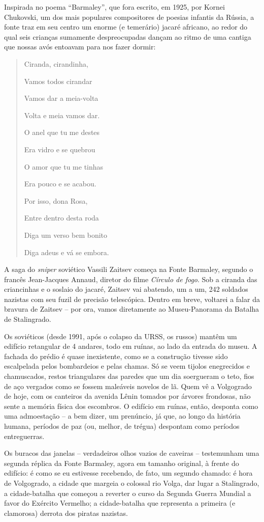 Inspirada no poema ``Barmaley'', que fora escrito, em 1925, por Kornei
Chukovski, um dos mais populares compositores de poesias infantis da
Rússia, a fonte traz em seu centro um enorme (e temerário) jacaré
africano, ao redor do qual seis crianças sumamente despreocupadas dançam
ao ritmo de uma cantiga que nossas avós entoavam para nos fazer dormir:

\begin{quote}
Ciranda, cirandinha,

Vamos todos cirandar

Vamos dar a meia-volta

Volta e meia vamos dar.

O anel que tu me destes

Era vidro e se quebrou

O amor que tu me tinhas

Era pouco e se acabou.

Por isso, dona Rosa,

Entre dentro desta roda

Diga um verso bem bonito

Diga adeus e vá se embora.
\end{quote}

A saga do \emph{sniper} soviético Vassili Zaitsev começa na Fonte
Barmaley, segundo o francês Jean-Jacques Annaud, diretor do filme
\emph{Círculo de fogo}. Sob a ciranda das criancinhas e o soslaio do
jacaré, Zaitsev vai abatendo, um a um, 242 soldados nazistas com seu
fuzil de precisão telescópica. Dentro em breve, voltarei a falar da
bravura de Zaitsev -- por ora, vamos diretamente ao Museu-Panorama da
Batalha de Stalingrado.

Os soviéticos (desde 1991, após o colapso da URSS, os russos) mantêm um
edifício retangular de 4 andares, todo em ruínas, ao lado da entrada do
museu. A fachada do prédio é quase inexistente, como se a construção
tivesse sido escalpelada pelos bombardeios e pelas chamas. Só se veem
tijolos enegrecidos e chamuscados, restos triangulares das paredes que
um dia soergueram o teto, fios de aço vergados como se fossem maleáveis
novelos de lã. Quem vê a Volgogrado de hoje, com os canteiros da avenida
Lênin tomados por árvores frondosas, não sente a memória física dos
escombros. O edifício em ruínas, então, desponta como uma admoestação --
a bem dizer, um prenúncio, já que, ao longo da história humana, períodos
de paz (ou, melhor, de trégua) despontam como períodos entreguerras.

Os buracos das janelas -- verdadeiros olhos vazios de caveiras --
testemunham uma segunda réplica da Fonte Barmaley, agora em tamanho
original, à frente do edifício: é como se eu estivesse recebendo, de
fato, um segundo chamado: é hora de Volgogrado, a cidade que margeia o
colossal rio Volga, dar lugar a Stalingrado, a cidade-batalha que
começou a reverter o curso da Segunda Guerra Mundial a favor do Exército
Vermelho; a cidade-batalha que representa a primeira (e clamorosa)
derrota dos piratas nazistas.

